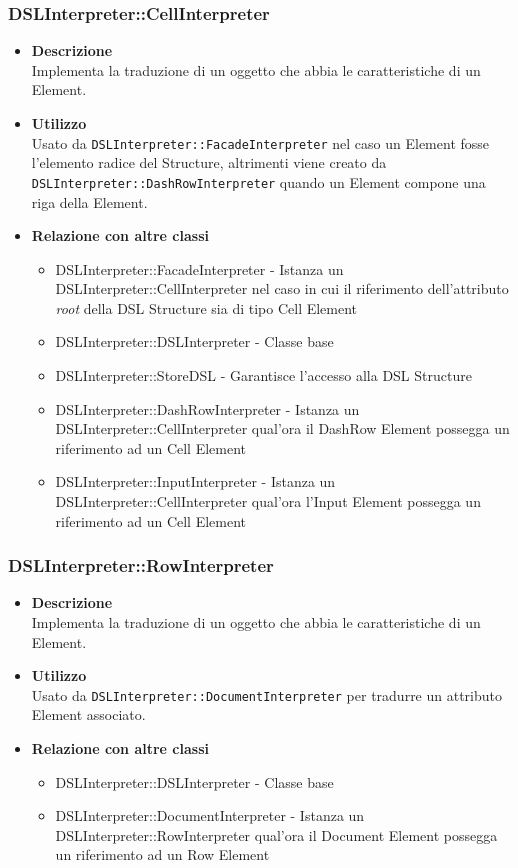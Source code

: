 \subsubsection{DSLInterpreter::CellInterpreter}
\begin{itemize}
\item \textbf{Descrizione} \hfill \\
Implementa la traduzione di un oggetto che abbia le caratteristiche di un  Element.
\item \textbf{Utilizzo} \hfill \\
Usato da \texttt{DSLInterpreter::FacadeInterpreter} nel caso un  Element fosse l'elemento radice del  Structure, altrimenti viene creato da \\\texttt{DSLInterpreter::DashRowInterpreter} quando un  Element compone una riga della  Element.
\item \textbf{Relazione con altre classi}
\begin{itemize}
\item DSLInterpreter::FacadeInterpreter - Istanza un DSLInterpreter::CellInterpreter nel caso in cui il riferimento dell'attributo \textit{root} della DSL Structure sia di tipo Cell Element 
\item DSLInterpreter::DSLInterpreter - Classe base
\item DSLInterpreter::StoreDSL - Garantisce l'accesso alla DSL Structure
\item DSLInterpreter::DashRowInterpreter - Istanza un DSLInterpreter::CellInterpreter qual'ora il DashRow Element possegga un riferimento ad un Cell Element
\item DSLInterpreter::InputInterpreter - Istanza un DSLInterpreter::CellInterpreter qual'ora l'Input Element possegga un riferimento ad un Cell Element
\end{itemize}
\end{itemize}

\subsubsection{DSLInterpreter::RowInterpreter}
\begin{itemize}
\item \textbf{Descrizione} \hfill \\
Implementa la traduzione di un oggetto che abbia le caratteristiche di un  Element.
\item \textbf{Utilizzo} \hfill \\
Usato da \texttt{DSLInterpreter::DocumentInterpreter} per tradurre un attributo  Element associato.
\item \textbf{Relazione con altre classi}  
\begin{itemize}
\item DSLInterpreter::DSLInterpreter - Classe base
\item DSLInterpreter::DocumentInterpreter - Istanza un DSLInterpreter::RowInterpreter qual'ora il Document Element possegga un riferimento ad un Row Element
\end{itemize}
\end{itemize}

